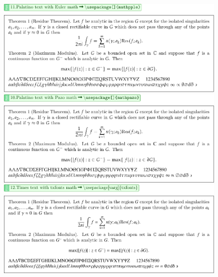 \documentclass[12pt]{article}
\begin{document}
\begin{figure}[!htb]
    \centering
    \includegraphics[width=.95\linewidth]{./MathFontVision/Palatino-Text-with-Euler-Math.pdf}

    \vspace*{2em}
    \includegraphics[width=.95\linewidth]{./MathFontVision/Palatino-Text-with-Pazo-Math.pdf}
    
    \vspace*{2em}
    \includegraphics[width=.95\linewidth]{./MathFontVision/Times-Text-with-Txfonts-Math.pdf}
\end{figure}
\end{document}
